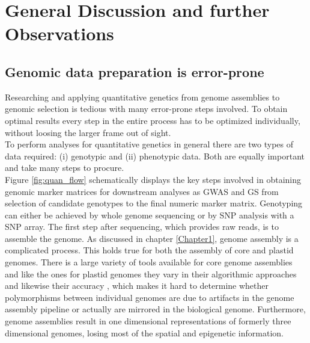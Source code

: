 \chapter{General Discussion and further Observations} %
\label{Chapter6}
\section{Genomic data preparation is error-prone}

Researching and applying quantitative genetics from genome assemblies to genomic selection
is tedious with many error-prone steps involved. To obtain optimal results every step in
the entire process has to be optimized individually, without loosing the larger frame out
of sight. \\
To perform analyses for quantitative genetics in general there are two types of data
required: (i) genotypic and (ii) phenotypic data. Both are equally important and take many
steps to procure. \\
Figure \ref{fig:quan_flow} schematically displays the key steps involved in obtaining
genomic marker matrices for downstream analyses as GWAS and GS from selection of candidate
genotypes to the final numeric marker matrix. Genotyping can either be achieved by whole
genome sequencing or by SNP analysis with a SNP array.  The first step after sequencing,
which provides raw reads, is to assemble the genome. As discussed in chapter
\ref{Chapter1}, genome assembly is a complicated process. This holds true for both the
assembly of core and plastid genomes. There is a large variety of tools available for core
genome assemblies and like the ones for plastid genomes they vary in their algorithmic
approaches and likewise their accuracy \cite{zhang2011practical}, which makes it hard to
determine whether polymorphisms between individual genomes are due to artifacts in the
genome assembly pipeline or actually are mirrored in the biological genome. Furthermore,
genome assemblies result in one dimensional representations of formerly three dimensional
genomes, losing most of the spatial and epigenetic information.

